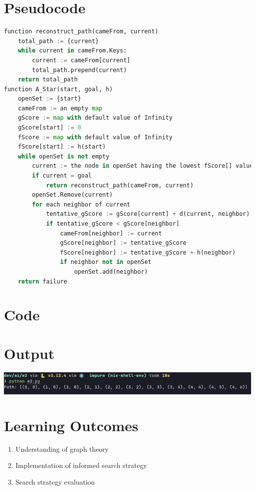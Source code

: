 \documentclass[12pt]{fphw}
\begin{document}
\section{Pseudocode}
    \begin{lstlisting}[language=Python, tabsize=2]
function reconstruct_path(cameFrom, current)
    total_path := {current}
    while current in cameFrom.Keys:
        current := cameFrom[current]
        total_path.prepend(current)
    return total_path
function A_Star(start, goal, h)
    openSet := {start}
    cameFrom := an empty map
    gScore := map with default value of Infinity
    gScore[start] := 0
    fScore := map with default value of Infinity
    fScore[start] := h(start)
    while openSet is not empty
        current := the node in openSet having the lowest fScore[] value
        if current = goal
            return reconstruct_path(cameFrom, current)
        openSet.Remove(current)
        for each neighbor of current
            tentative_gScore := gScore[current] + d(current, neighbor)
            if tentative_gScore < gScore[neighbor]
                cameFrom[neighbor] := current
                gScore[neighbor] := tentative_gScore
                fScore[neighbor] := tentative_gScore + h(neighbor)
                if neighbor not in openSet
                    openSet.add(neighbor)
    return failure
    \end{lstlisting}
\section{Code}
    
\section{Output}
    \begin{center}
      \includegraphics[width=0.6\columnwidth]{./e2.png}
    \end{center}
\section{Learning Outcomes}
\begin{enumerate}
  \item Understanding of graph theory 
  \item Implementation of informed search strategy 
  \item Search strategy evaluation
\end{enumerate}
\end{document}
